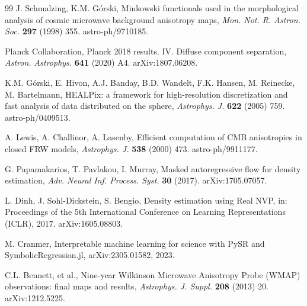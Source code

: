 \documentclass[preprint,12pt,nonatbib]{elsarticle}
\begin{document}
\begin{thebibliography}{99}
J. Schmalzing, K.M. G\'orski,
Minkowski functionals used in the morphological analysis of cosmic microwave background anisotropy maps,
\emph{Mon. Not. R. Astron. Soc.} \textbf{297} (1998) 355.
astro-ph/9710185.

Planck Collaboration,
Planck 2018 results. IV. Diffuse component separation,
\emph{Astron. Astrophys.} \textbf{641} (2020) A4.
arXiv:1807.06208.

K.M. G\'orski, E. Hivon, A.J. Banday, B.D. Wandelt, F.K. Hansen, M. Reinecke, M. Bartelmann,
HEALPix: a framework for high-resolution discretization and fast analysis of data distributed on the sphere,
\emph{Astrophys. J.} \textbf{622} (2005) 759.
astro-ph/0409513.

A. Lewis, A. Challinor, A. Lasenby,
Efficient computation of CMB anisotropies in closed FRW models,
\emph{Astrophys. J.} \textbf{538} (2000) 473.
astro-ph/9911177.

G. Papamakarios, T. Pavlakou, I. Murray,
Masked autoregressive flow for density estimation,
\emph{Adv. Neural Inf. Process. Syst.} \textbf{30} (2017).
arXiv:1705.07057.

L. Dinh, J. Sohl-Dickstein, S. Bengio,
Density estimation using Real NVP,
in: Proceedings of the 5th International Conference on Learning Representations (ICLR), 2017.
arXiv:1605.08803.

M. Cranmer,
Interpretable machine learning for science with PySR and SymbolicRegression.jl,
arXiv:2305.01582, 2023.

C.L. Bennett, et al.,
Nine-year Wilkinson Microwave Anisotropy Probe (WMAP) observations: final maps and results,
\emph{Astrophys. J. Suppl.} \textbf{208} (2013) 20.
arXiv:1212.5225.

\end{thebibliography}
\end{document}
